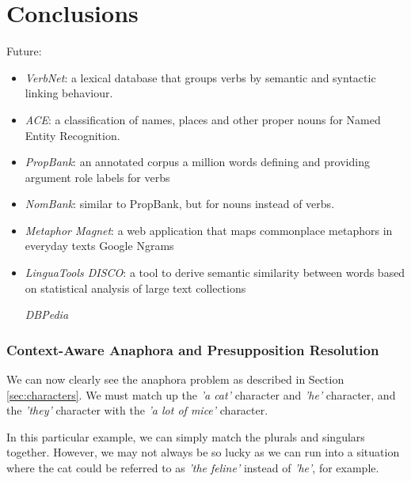 \def\baselinestretch{1}
\chapter{Conclusions}
\ifpdf
    \graphicspath{{Conclusions/ConclusionsFigs/PNG/}{Conclusions/ConclusionsFigs/PDF/}{Conclusions/ConclusionsFigs/}}
\else
    \graphicspath{{Conclusions/ConclusionsFigs/EPS/}{Conclusions/ConclusionsFigs/}}
\fi

\def\baselinestretch{1.66}

Future:
\begin{itemize}
\item{\textit{VerbNet}: a lexical database that groups verbs by semantic and syntactic linking behaviour.\cite{schuler2005verbnet}}
\item{\textit{ACE}: a classification of names, places and other proper nouns for Named Entity Recognition.\cite{doddington2004automatic}}
\item{\textit{PropBank}: an annotated corpus a million words defining and providing argument role labels for verbs\cite{kingsbury2002treebank}}
\item{\textit{NomBank}: similar to PropBank, but for nouns instead of verbs.\cite{meyers2004nombank}}
\item{\textit{Metaphor Magnet}: a web application that maps commonplace metaphors in everyday texts\cite{vealespecifying}}
Google Ngrams
\item{\textit{LinguaTools DISCO}: a tool to derive semantic similarity between words based on statistical analysis of large text collections\cite{kolb2008disco}}

\textit{DBPedia}
\end{itemize}

\subsection{Context-Aware Anaphora and Presupposition Resolution}
\label{sec:ca-ar}
We can now clearly see the anaphora problem as described in Section \ref{sec:characters}. We must match up the \textit{'a cat'} character and \textit{'he'} character, and the \textit{'they'} character with the \textit{'a lot of mice'} character. 

In this particular example, we can simply match the plurals and singulars together. However, we may not always be so lucky as we can run into a situation where the cat could be referred to as \textit{'the feline'} instead of \textit{'he'}, for example.

